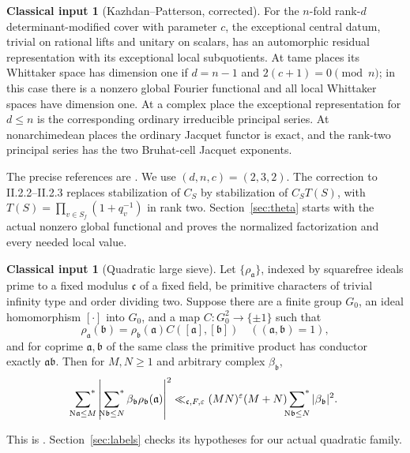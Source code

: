 \documentclass[11pt,a4paper]{article}
\numberwithin{equation}{section}
\theoremstyle{definition}
\newtheorem{inputthm}[theorem]{Classical input}
\theoremstyle{remark}
\newcommand{\N}{\mathrm N}
\newcommand{\sfstar}{\sideset{}{^*}\sum}
\newcommand{\eps}{\varepsilon}
\begin{document}
\begin{inputthm}[Kazhdan--Patterson, corrected]\label{inp:KP}
For the $n$-fold rank-$d$ determinant-modified cover with parameter $c$, the exceptional central datum, trivial on rational lifts and unitary on scalars, has an automorphic residual representation with its exceptional local subquotients. At tame places its Whittaker space has dimension one if $d=n-1$ and $2(c+1)=0\pmod n$; in this case there is a nonzero global Fourier functional and all local Whittaker spaces have dimension one. At a complex place the exceptional representation for $d\le n$ is the corresponding ordinary irreducible principal series. At nonarchimedean places the ordinary Jacquet functor is exact, and the rank-two principal series has the two Bruhat-cell Jacquet exponents.
\end{inputthm}
The precise references are \cite[Sections 0.1--0.3 and II.1; Theorem I.2.9; Corollary I.3.6; Theorems I.6.4--I.6.5; II.2.1 and II.2.5]{KP84}. We use $(d,n,c)=(2,3,2)$. The correction \cite{KP85} to II.2.2--II.2.3 replaces stabilization of $C_S$ by stabilization of $C_ST(S)$, with $T(S)=\prod_{v\in S_f}(1+q_v^{-1})$ in rank two. Section~\ref{sec:theta} starts with the actual nonzero global functional and proves the normalized factorization and every needed local value.

\begin{inputthm}[Quadratic large sieve]\label{inp:GL}
Let $\{\rho_{\mathfrak a}\}$, indexed by squarefree ideals prime to a fixed modulus $\mathfrak c$ of a fixed field, be primitive characters of trivial infinity type and order dividing two. Suppose there are a finite group $G_0$, an ideal homomorphism $[\cdot]$ into $G_0$, and a map $C:G_0^2\to\{\pm1\}$ such that
\[
 \rho_{\mathfrak a}(\mathfrak b)
 =\rho_{\mathfrak b}(\mathfrak a)C([\mathfrak a],[\mathfrak b])
 \quad((\mathfrak a,\mathfrak b)=1),
\]
and for coprime $\mathfrak a,\mathfrak b$ of the same class the primitive product has conductor exactly $\mathfrak a\mathfrak b$. Then for $M,N\ge1$ and arbitrary complex $\beta_{\mathfrak b}$,
\[
 \sfstar_{\N\mathfrak a\le M}
 \left|\sfstar_{\N\mathfrak b\le N}\beta_{\mathfrak b}
                  \rho_{\mathfrak b}(\mathfrak a)\right|^2
 \ll_{\mathfrak c,F,\eps}(MN)^\eps(M+N)
             \sfstar_{\N\mathfrak b\le N}|\beta_{\mathfrak b}|^2.
\]
\end{inputthm}
This is \cite[Definition 1, Theorem 1.1]{GL}. Section~\ref{sec:labels} checks its hypotheses for our actual quadratic family.
\end{document}
